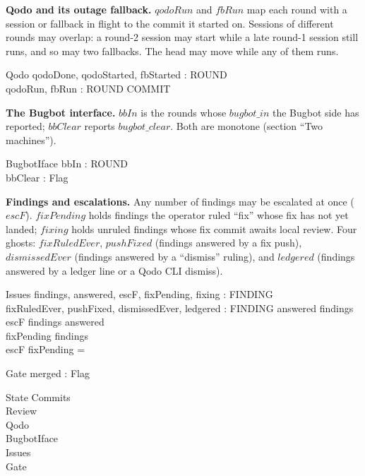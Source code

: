 \documentclass{article}
\begin{document}
\textbf{Qodo and its outage fallback.} $qodoRun$ and $fbRun$ map each round
with a session or fallback in flight to the commit it started on. Sessions of
different rounds may overlap: a round-2 session may start while a late
round-1 session still runs, and so may two fallbacks. The head may move while
any of them runs.

\begin{schema}{Qodo}
  qodoDone, qodoStarted, fbStarted : \power ROUND \\
  qodoRun, fbRun : ROUND \pfun COMMIT
\end{schema}

\textbf{The Bugbot interface.} $bbIn$ is the rounds whose $bugbot\_in$ the
Bugbot side has reported; $bbClear$ reports $bugbot\_clear$. Both are
monotone (section ``Two machines'').

\begin{schema}{BugbotIface}
  bbIn : \power ROUND \\
  bbClear : Flag
\end{schema}

\textbf{Findings and escalations.} Any number of findings may be escalated at
once ($escF$). $fixPending$ holds findings the operator ruled ``fix'' whose fix
has not yet landed; $fixing$ holds unruled findings whose fix commit awaits
local review. Four ghosts: $fixRuledEver$, $pushFixed$ (findings answered by
a fix push), $dismissedEver$ (findings answered by a ``dismiss'' ruling), and
$ledgered$ (findings answered by a ledger line or a Qodo CLI dismiss).

\begin{schema}{Issues}
  findings, answered, escF, fixPending, fixing : \power FINDING \\
  fixRuledEver, pushFixed, dismissedEver, ledgered : \power FINDING
\where
  answered \subseteq findings \\
  escF \subseteq findings \setminus answered \\
  fixPending \subseteq findings \\
  escF \cap fixPending = \emptyset
\end{schema}

\begin{schema}{Gate}
  merged : Flag
\end{schema}

\begin{schema}{State}
  Commits \\
  Review \\
  Qodo \\
  BugbotIface \\
  Issues \\
  Gate
\end{schema}
\end{document}
